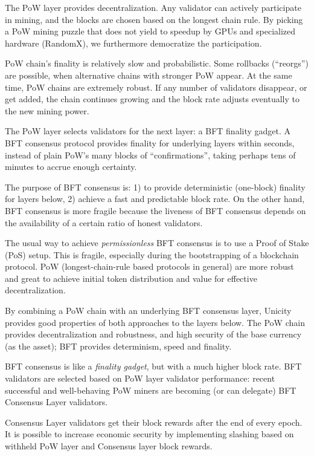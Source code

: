 \documentclass[twocolumn]{article}
\begin{document}
The PoW layer provides decentralization. Any validator can actively participate in mining, and the blocks are chosen based on the longest chain rule. By picking a PoW mining puzzle that does not yield to speedup by GPUs and specialized hardware (RandomX), we furthermore democratize the participation.

PoW chain's finality is relatively slow and probabilistic. Some rollbacks (``reorgs'') are possible, when alternative chains with stronger PoW appear. At the same time, PoW chains are extremely robust. If any number of validators disappear, or get added, the chain continues growing and the block rate adjusts eventually to the new mining power.

The PoW layer selects validators for the next layer: a BFT finality gadget. A BFT consensus protocol provides finality for underlying layers within seconds, instead of plain PoW's many blocks of ``confirmations'', taking perhaps tens of minutes to accrue enough certainty.

The purpose of BFT consensus is: 1) to provide deterministic (one-block) finality for layers below, 2) achieve a fast and predictable block rate. On the other hand, BFT consensus is more fragile because the liveness of BFT consensus depends on the availability of a certain ratio of honest validators.

The usual way to achieve \emph{permissionless} BFT consensus is to use a Proof of Stake (PoS) setup. This is fragile, especially during the bootstrapping of a blockchain protocol. PoW (longest-chain-rule based protocols in general) are more robust and great to achieve initial token distribution and value for effective decentralization.

By combining a PoW chain with an underlying BFT consensus layer, Unicity provides good properties of both approaches to the layers below. The PoW chain provides decentralization and robustness, and high security of the base currency (as the asset); BFT provides determinism, speed and finality.

BFT consensus is like a \emph{finality gadget}, but with a much higher block rate. BFT validators are selected based on PoW layer validator performance: recent successful and well-behaving PoW miners are becoming (or can delegate) BFT Consensus Layer validators.

Consensus Layer validators get their block rewards after the end of every epoch. It is possible to increase economic security by implementing slashing based on withheld PoW layer and Consensus layer block rewards.
\end{document}
